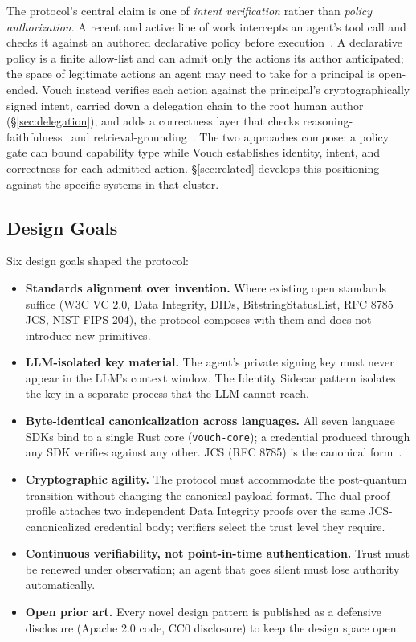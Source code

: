 \documentclass[11pt,a4paper]{article}
\begin{document}
The protocol's central claim is one of \emph{intent verification} rather than \emph{policy authorization}. A recent and active line of work intercepts an agent's tool call and checks it against an authored declarative policy before execution~\cite{oap2026,faramesh2026,aarm2026,righttoact2026,forge2026}. A declarative policy is a finite allow-list and can admit only the actions its author anticipated; the space of legitimate actions an agent may need to take for a principal is open-ended. Vouch instead verifies each action against the principal's cryptographically signed intent, carried down a delegation chain to the root human author (\S\ref{sec:delegation}), and adds a correctness layer that checks reasoning-faithfulness~\cite{pad017} and retrieval-grounding~\cite{pad045}. The two approaches compose: a policy gate can bound capability type while Vouch establishes identity, intent, and correctness for each admitted action. \S\ref{sec:related} develops this positioning against the specific systems in that cluster.

\subsection{Design Goals}

Six design goals shaped the protocol:

\begin{itemize}[leftmargin=*]
\item \textbf{Standards alignment over invention.} Where existing open standards suffice (W3C VC 2.0, Data Integrity, DIDs, BitstringStatusList, RFC 8785 JCS, NIST FIPS 204), the protocol composes with them and does not introduce new primitives.
\item \textbf{LLM-isolated key material.} The agent's private signing key must never appear in the LLM's context window. The Identity Sidecar pattern isolates the key in a separate process that the LLM cannot reach.
\item \textbf{Byte-identical canonicalization across languages.} All seven language SDKs bind to a single Rust core (\texttt{vouch-core}); a credential produced through any SDK verifies against any other. JCS (RFC 8785) is the canonical form~\cite{pad039}.
\item \textbf{Cryptographic agility.} The protocol must accommodate the post-quantum transition without changing the canonical payload format. The dual-proof profile attaches two independent Data Integrity proofs over the same JCS-canonicalized credential body; verifiers select the trust level they require.
\item \textbf{Continuous verifiability, not point-in-time authentication.} Trust must be renewed under observation; an agent that goes silent must lose authority automatically.
\item \textbf{Open prior art.} Every novel design pattern is published as a defensive disclosure (Apache 2.0 code, CC0 disclosure) to keep the design space open.
\end{itemize}
\end{document}
